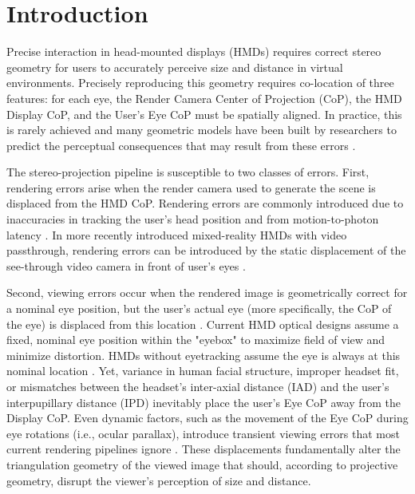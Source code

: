 \section{Introduction}
\label{sec:intro}
Precise interaction in head-mounted displays (HMDs) requires correct stereo geometry for users to accurately perceive size and distance in virtual environments. Precisely reproducing this geometry requires co-location of three features: for each eye, the Render Camera Center of Projection (CoP), the HMD Display CoP, and the User’s Eye CoP must be spatially aligned. In practice, this is rarely achieved and  many geometric models have been built by researchers to predict the perceptual consequences that may result from these errors \cite{held2008misperceptions, robinett92, woods93, krajancich2020}.

The stereo-projection pipeline is susceptible to two classes of errors. First, rendering errors arise when the render camera used to generate the scene is displaced from the HMD CoP. Rendering errors are commonly introduced due to inaccuracies in tracking the user's head position \cite{holloway1997} and from motion-to-photon latency \cite{allison1999}. In more recently introduced mixed-reality HMDs with video passthrough, rendering errors can be introduced by the static displacement of the see-through video camera in front of user's eyes \cite{biocca98, Lee13, kuo23}.

Second, viewing errors occur when the rendered image is geometrically correct for a nominal eye position, but the user’s actual eye (more specifically, the CoP of the eye) is displaced from this location \cite{vishwanath05, banks2014camera, held2008misperceptions, guan2023perceptual}. Current HMD optical designs assume a fixed, nominal eye position within the "eyebox" to maximize field of view and minimize distortion. HMDs without eyetracking assume the eye is always at this nominal location \cite{Rong25}. Yet, variance in human facial structure, improper headset fit, or mismatches between the headset’s inter-axial distance (IAD) and the user’s interpupillary distance (IPD) inevitably place the user’s Eye CoP away from the Display CoP. Even dynamic factors, such as the movement of the Eye CoP during eye rotations (i.e., ocular parallax), introduce transient viewing errors that most current rendering pipelines ignore \cite{holloway1997, rolland04, wann95}. These displacements fundamentally alter the triangulation geometry of the viewed image that should, according to projective geometry, disrupt the viewer's perception of size and distance.


